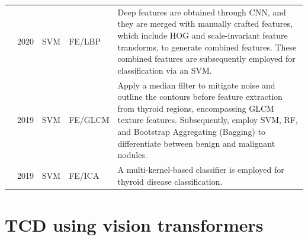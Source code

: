 \documentclass[a4paper,fleqn]{cas-sc}
\begin{document}
\begin{table}[t!]
\begin{tabular}{
m{5mm}
m{10mm}
m{10mm}
m{14mm}
m{100mm}
}
{\small \cite{sun2020evaluation}} & 2020 & \ac{SVM} & FE/LBP & Deep features are obtained through \ac{CNN}, and they are merged with manually crafted features, which include \ac{HOG} and scale-invariant feature transforms, to generate combined features. These combined features are subsequently employed for classification via an \ac{SVM}. \\


{\small \cite{liu2019value}} & 2019 & \ac{SVM} & FE/GLCM &  Apply a median filter to mitigate noise and outline the contours before feature extraction from thyroid regions, encompassing \ac{GLCM} texture features. Subsequently, employ \ac{SVM}, \ac{RF}, and Bootstrap Aggregating (Bagging) to differentiate between benign and malignant nodules. \\

{\small \cite{kalaimani2019analysis}} & 2019 & \ac{SVM} & FE/ICA & A multi-kernel-based classifier is employed for thyroid disease classification.  \\
\hline
\end{tabular}
\end{table}

\section{\ac{TCD} using vision transformers}
\end{document}
